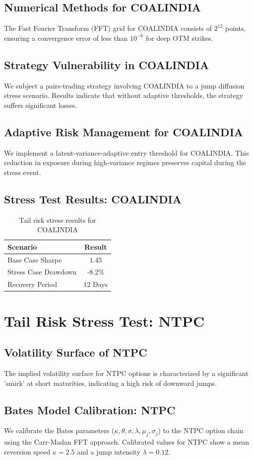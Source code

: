 \documentclass[12pt,a4paper,twoside]{article}
\begin{document}
\subsection{Numerical Methods for COALINDIA}
The Fast Fourier Transform (FFT) grid for COALINDIA consists of $2^{12}$ points, ensuring a convergence error of less than $10^{-6}$ for deep OTM strikes.
\subsection{Strategy Vulnerability in COALINDIA}
We subject a pairs-trading strategy involving COALINDIA to a jump diffusion stress scenario. Results indicate that without adaptive thresholds, the strategy suffers significant losses.
\subsection{Adaptive Risk Management for COALINDIA}
We implement a latent-variance-adaptive entry threshold for COALINDIA. This reduction in exposure during high-variance regimes preserves capital during the stress event.
\subsection{Stress Test Results: COALINDIA}
\begin{table}[H]
\centering
\begin{tabular}{|l|c|}
\hline
Scenario & Result \\
\hline
Base Case Sharpe & 1.45 \\
Stress Case Drawdown & -8.2\% \\
Recovery Period & 12 Days \\
\hline
\end{tabular}
\caption{Tail risk stress results for COALINDIA}
\end{table}
\newpage

\section{Tail Risk Stress Test: NTPC}
\subsection{Volatility Surface of NTPC}
The implied volatility surface for NTPC options is characterized by a significant 'smirk' at short maturities, indicating a high risk of downward jumps.
\subsection{Bates Model Calibration: NTPC}
We calibrate the Bates parameters ($\kappa, \theta, \sigma, \lambda, \mu_j, \sigma_j$) to the NTPC option chain using the Carr-Madan FFT approach.
Calibrated values for NTPC show a mean reversion speed $\kappa = 2.5$ and a jump intensity $\lambda = 0.12$.
\end{document}

